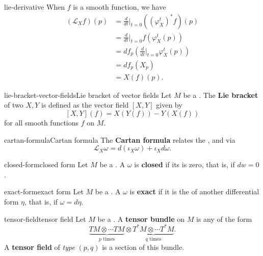 \begin{example}{lie-derivative}
    When $f$ is a smooth function, we have
    \[ \begin{aligned}
        (\mathcal{L}_X f)(p)
            &= \frac{d}{dt}\Big|_{t = 0} \left(\left(\varphi^t_X\right)^* f \right)(p) \\
            &= \frac{d}{dt}\Big|_{t = 0} f \left(\varphi^t_X(p)\right) \\
            &= df_p \left( \frac{d}{dt}\Big|_{t = 0} \varphi^t_X(p) \right) \\
            &= df_p(X_p) \\
            &= X(f)(p) .
    \end{aligned} \]
    
\end{example}

\begin{topic}{lie-bracket-vector-fields}{Lie bracket of vector fields}
    Let $M$ be a . The \textbf{Lie bracket} of two  $X, Y$ is defined as the vector field $[X, Y]$ given by
    \[ [X, Y](f) = X(Y(f)) - Y(X(f)) \]
    for all smooth functions $f$ on $M$.
\end{topic}

\begin{topic}{cartan-formula}{Cartan formula}
    The \textbf{Cartan formula} relates the ,  and  via
    \[ \mathcal{L}_X \omega = d(\iota_X \omega) + \iota_X d \omega . \]
\end{topic}

\begin{topic}{closed-form}{closed form}
    Let $M$ be a . A  $\omega$ is \textbf{closed} if its  is zero, that is, if $dw = 0$.
\end{topic}

\begin{topic}{exact-form}{exact form}
    Let $M$ be a . A  $\omega$ is \textbf{exact} if it is the  of another differential form $\eta$, that is, if $\omega = d \eta$.
\end{topic}

\begin{topic}{tensor-field}{tensor field}
    Let $M$ be a . A \textbf{tensor bundle} on $M$ is any  of the form
    \[ \underbrace{TM \otimes \cdots TM}_{p \text{ times}} \otimes \underbrace{T^*M \otimes \cdots T^*M}_{q \text{ times}} . \]
    A \textbf{tensor field} of \textit{type} $(p, q)$ is a section of this bundle.
\end{topic}

